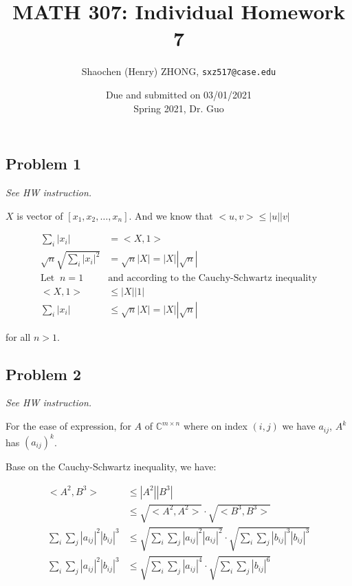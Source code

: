 \documentclass[11pt]{article}
\newcommand{\ilc}{\texttt}
\providecommand{\len}[1]{\left| #1 \right|}
\begin{document}
\title{\textbf{MATH 307: Individual Homework 7}}


\author{Shaochen (Henry) ZHONG, \ilc{sxz517@case.edu}}

\date{Due and submitted on 03/01/2021 \\ Spring 2021, Dr. Guo}
\maketitle



\subsection*{Problem 1}
\textit{See HW instruction.}\newline

$X$ is vector of $[x_1, x_2, \dots, x_n]$. And we know that $<u, v> \leq |u||v|$

\begin{align*}
    \sum_{i} \len{x_i} &= <X, 1> \\
    \sqrt{n} \sqrt{\sum_{i} \len{x_i}^2} &= \sqrt{n} \len{X} = \len{X} \len{\sqrt{n}} \\
    \text{Let } \ n = 1 \ &\text{and according to the Cauchy-Schwartz inequality} \\
    <X, 1> &\leq \len{X} \len{1} \\
    \sum_{i} \len{x_i} &\leq \sqrt{n} \len{X} = \len{X} \len{\sqrt{n}}
\end{align*}

for all $n > 1$.

\subsection*{Problem 2}
\textit{See HW instruction.}\newline

For the ease of expression, for $A$ of $\mathbb{C}^{m \times n}$ where on index $(i, j)$ we have $a_{ij}$, $A^k$ has $(a_{ij})^k$.

Base on the Cauchy-Schwartz inequality, we have:

\begin{align*}
    <A^2, B^3> &\leq |A^2||B^3| \\
    &\leq \sqrt{<A^2, A^2>} \cdot \sqrt{<B^3, B^3>} \\
    \sum_i \sum_j \len{a_{ij}}^2 \len{b_{ij}}^3 &\leq \sqrt{\sum_i \sum_j \len{a_{ij}}^2 \len{a_{ij}}^2} \cdot \sqrt{\sum_i \sum_j \len{b_{ij}}^3 \len{b_{ij}}^3} \\
    \sum_i \sum_j \len{a_{ij}}^2 \len{b_{ij}}^3 &\leq \sqrt{\sum_i \sum_j \len{a_{ij}}^4} \cdot \sqrt{\sum_i \sum_j \len{b_{ij}}^6}
\end{align*}
\end{document}
